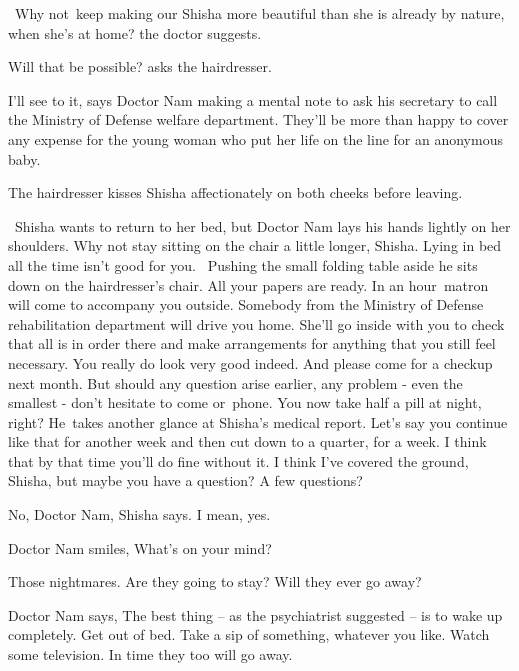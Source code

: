 \documentclass[letterpaper]{article}
\begin{document}
~{\textquotedbl}Why not~keep making our Shisha more beautiful than she is already by nature, when she's at
home?{\textquotedbl} the doctor suggests. 

{\textquotedbl}Will that be possible?{\textquotedbl} asks the hairdresser. 

{\textquotedbl}I'll see to it,{\textquotedbl} says Doctor Nam making a mental note to ask his secretary to call the
Ministry of Defense welfare department. They'll be more than happy to cover any expense for the young woman who put her
life on the line for an anonymous baby.

The hairdresser kisses Shisha affectionately on both cheeks before leaving.

~Shisha wants to return to her bed, but Doctor Nam lays his hands lightly on her shoulders. {\textquotedbl}Why not stay
sitting on the chair a little longer, Shisha. Lying in bed all the time isn't good for you.{\textquotedbl} \ Pushing
the small folding table aside he sits down on the hairdresser's chair. {\textquotedbl}All your papers are ready. In an
hour\textcolor{red}{~}matron will come to accompany you outside. Somebody from the Ministry of Defense rehabilitation
department will drive you home. She'll go inside with you to check that all is in order there and make arrangements for
anything that you still feel necessary. You really do look very good indeed. And please come for a checkup next month.
But should any question arise earlier, any problem - even the smallest - don't hesitate to come or~phone. You now take
half a pill at night, right?{\textquotedbl} He~takes another glance at Shisha's medical report. {\textquotedbl}Let's
say you continue like that for another week and then cut down to a quarter\textcolor[rgb]{0.0,0.4392157,0.7529412}{,}
for a week. I think that by that time you'll do fine without it. I think I've covered the ground, Shisha, but maybe you
have a question? A few questions?{\textquotedbl} 

{\textquotedbl}No, Doctor Nam,{\textquotedbl} Shisha says. {\textquotedbl}I mean, yes.{\textquotedbl} 

Doctor Nam smiles, {\textquotedbl}What's on your mind?{\textquotedbl} 

{\textquotedbl}Those nightmares. Are they going to stay? Will they ever go away?{\textquotedbl} 

Doctor Nam says, {\textquotedbl}The best thing -- as the psychiatrist suggested -- is to wake up completely. Get out of
bed. Take a sip of something,\textcolor[rgb]{0.0,0.4392157,0.7529412}{ }whatever you like. Watch some television. In
time they too will go away.{\textquotedbl}
\end{document}
